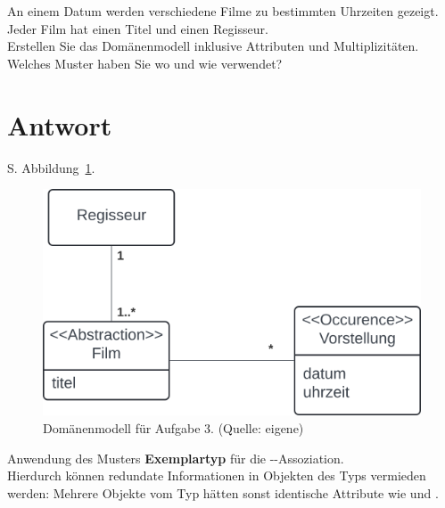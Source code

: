 An einem Datum werden verschiedene Filme zu bestimmten Uhrzeiten gezeigt.
Jeder Film hat einen Titel und einen Regisseur.\\

\noindent
Erstellen Sie das Domänenmodell inklusive Attributen und Multiplizitäten.\\

\noindent
Welches Muster haben Sie wo und wie verwendet?


\section*{Antwort}
S. Abbildung~\ref{fig:film}.

\begin{figure}
    \centering
    \includegraphics[scale=0.5]{chapters/aufgabe 3/img/film}
    \caption{Domänenmodell für Aufgabe 3. (Quelle: eigene)}
    \label{fig:film}
\end{figure}

\noindent
Anwendung des Musters \textbf{Exemplartyp} für die --Assoziation.\\

\noindent
Hierdurch können redundate Informationen in Objekten des Typs  vermieden werden: Mehrere Objekte vom Typ  hätten sonst identische Attribute wie  und .\\

